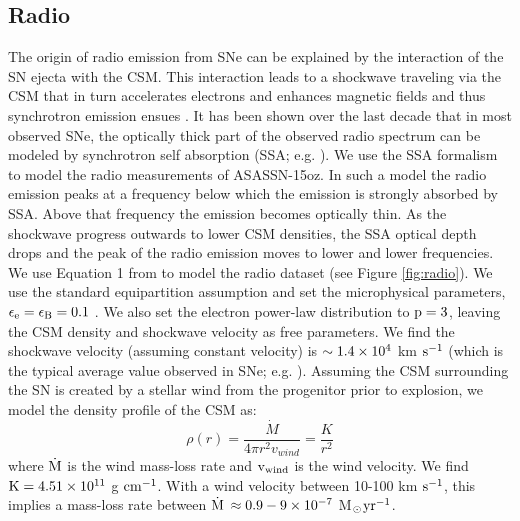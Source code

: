 \documentclass[a4paper,fleqn,usenatbib]{mnras}
\newcommand{\msunperiod}{M$\rm{_{\odot}}$}
\begin{document}
\subsection{Radio}\label{sec:RadioInteraction}
The origin of radio emission from SNe can be explained by the interaction of the SN ejecta with the CSM. 
This interaction leads to a shockwave traveling via the CSM that in turn accelerates electrons and enhances magnetic fields and thus synchrotron emission ensues \citep{1982chevalier,1998chevalier, 2002weiler, 2006chevalier}. 
It has been shown over the last decade that in most observed SNe, the optically thick part of the observed radio spectrum can be modeled by synchrotron self absorption (SSA; e.g. \citealt{2012soderberg, 2013horesh}).
We use the \citet{1998chevalier} SSA formalism to model the radio measurements of ASASSN-15oz.
In such a model the radio emission peaks at a frequency below which the emission is strongly absorbed by SSA. 
Above that frequency the emission becomes optically thin. 
As the shockwave progress outwards to lower CSM densities, the SSA optical depth drops and the peak of the radio emission moves to lower and lower frequencies. 
We use Equation 1 from \citet{1998chevalier} to model the radio dataset (see Figure \ref{fig:radio}).
We use the standard equipartition assumption and set the microphysical parameters, $\rm{\epsilon_{e} = \epsilon_{B}  = 0.1}$ \citep{2006chevalier}. 
We also set the electron power-law distribution to $\rm{p=3}$, leaving the CSM density and shockwave velocity as free parameters. 
We find the shockwave velocity (assuming constant velocity) is $\rm{\sim 1.4\times10^{4}}$ km $\rm{s^{-1}}$ (which is the typical average value observed in SNe; e.g. \citealt{2006chevalier}).
Assuming the CSM surrounding the SN is created by a stellar wind from the progenitor prior to explosion, we model the density profile of the CSM as:
\begin{equation} \label{eqn:density}
\rho(r) = \frac{\dot{M}}{4\pi r^{2}v_{wind}} = \frac{K}{r^{2}}
\end{equation}
where $\rm{\dot{M}}$ is the wind mass-loss rate and $\rm{v_{wind}}$ is the wind velocity.
We find $\rm{K = 4.51\times 10^{11}}$ g $\rm{cm^{-1}}$.
With a wind velocity between 10-100 km $\rm{s^{-1}}$, this implies a mass-loss rate between $\rm{\dot{M}}$ $\rm{\approx 0.9-9\times 10^{-7}}$ \msunperiod $\rm{yr^{-1}}$.
\end{document}
